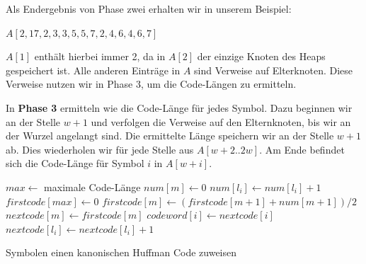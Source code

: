 \documentclass[a4paper,11pt]{scrartcl}%
\theoremstyle{change}
\theoremstyle{nonumberplain}
\theoremstyle{change}
\theoremstyle{nonumberplain}
\theoremstyle{change}
\theoremstyle{nonumberplain}
\begin{document}
Als Endergebnis von Phase zwei erhalten wir in unserem Beispiel:

\begin{center}
	$A[2,17,2,3,3,5,5,7,2,4,6,4,6,7]$
\end{center}

$A[1]$ enthält hierbei immer 2, da in $A[2]$ der einzige Knoten des Heaps gespeichert ist. Alle anderen Einträge in $A$ sind Verweise auf Elterknoten. \cite[S. 342ff]{managingGigabytes} Diese Verweise nutzen wir in Phase 3, um die Code-Längen zu ermitteln.



In \textbf{Phase 3} ermitteln wie die Code-Länge für jedes Symbol. Dazu beginnen wir an der Stelle $w + 1$ und verfolgen die Verweise auf den Elternknoten, bis wir an der Wurzel angelangt sind. Die ermittelte Länge speichern wir an der Stelle $w + 1$ ab. Dies wiederholen wir für jede Stelle aus $A[w+2..2w]$. Am Ende befindet sich die Code-Länge für Symbol $i$ in $A[w+i]$.\cite[S. 344]{managingGigabytes}


\begin{algorithm}
	\SetAlgoLined
	\SetAlgoNoEnd%
	$max \leftarrow$ maximale Code-Länge\;
	 {
		$num[m] \leftarrow 0$\;
	}
	 {
		$num[l_i] \leftarrow num[l_i] + 1$\;
	}
	$firstcode[max] \leftarrow 0$\;
	 {
		$firstcode[m] \leftarrow (firstcode[m+1] + num[m+1])/2$\;
	}
	 {
		$nextcode[m] \leftarrow firstcode[m]$
	}
	 {
		$codeword[i] \leftarrow nextcode[i]$\;
		$nextcode[l_i] \leftarrow nextcode[l_i] + 1$\;
	}
	
	
	
	\caption{Symbolen einen kanonischen Huffman Code zuweisen \cite[S. 338]{managingGigabytes}}
	\label{algo:huf-assignCode}
\end{algorithm}
\end{document}
